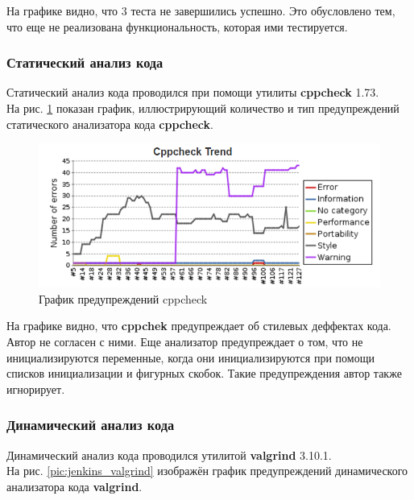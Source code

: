 На графике видно, что 3 теста не завершились успешно. Это обусловлено тем, что еще не реализована функциональность, которая ими тестируется.

\subsubsection*{Статический анализ кода}
Статический анализ кода проводился при помощи утилиты \textbf{cppcheck} 1.73.\\
На рис. \ref{pic:jenkins_cppcheck} показан график, иллюстрирующий количество и тип предупреждений статического анализатора кода \textbf{cppcheck}.

\begin{figure}[H]
	\begin{center}
		\includegraphics[scale=0.5]{pics/Jenkins/cppcheck.png}
	    \caption{График предупреждений cppcheck} 
		\label{pic:jenkins_cppcheck}
	\end{center}
\end{figure}

На графике видно, что \textbf{cppchek} предупреждает об стилевых деффектах кода. Автор не согласен с ними. Еще анализатор предупреждает о том, что не инициализируются переменные, когда они инициализируются при помощи списков инициализации и фигурных скобок. Такие предупреждения автор также игнорирует.

\subsubsection*{Динамический анализ кода}
Динамический анализ кода проводился утилитой \textbf{valgrind} 3.10.1.\\
На рис. \ref{pic:jenkins_valgrind} изображён график предупреждений динамического анализатора кода \textbf{valgrind}.

